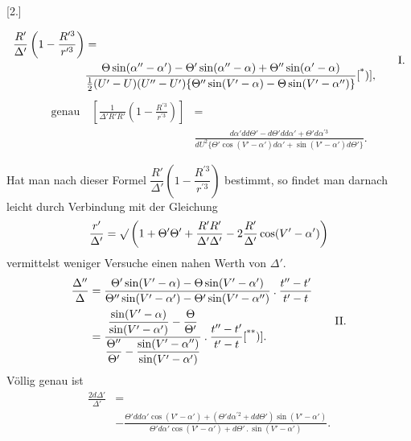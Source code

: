 \clearpage\begingroup{}
\makeatletter\tagsleft@true\let\veqno\@@leqno\makeatother
\noindent{\small [S. 2]}
\begin{center}
[2.]\par\medskip
{}
\end{center}
\begin{equation}
\begin{aligned}
\frac{R'}{\Delta'}\left(1-\frac{R^{\prime3}}{r^{\prime3}}\right)&={}\\
&\frac{\Theta\sin(\alpha''-\alpha')-\Theta'\sin(\alpha''-\alpha)+\Theta''\sin(\alpha'-\alpha)}
{\frac12(U'-U)(U''-U')\{\Theta''\sin(V'-\alpha)-\Theta\sin(V'-\alpha'')\}}
\text{[\textsuperscript{*})]},
\end{aligned}\tag*{I.}
\end{equation}
\begingroup\renewcommand{\thefootnote}{}\endgroup
\begin{equation}
\begin{aligned}
\text{genau}\quad\left[\frac{1}{\Delta'R'R'}\left(1-\frac{R^{\prime3}}{r^{\prime3}}\right)\right]&={}\\
&\frac{d\alpha' dd\Theta'-d\Theta' dd\alpha'+\Theta'd\alpha^{\prime3}}
{dU^2\{\Theta'\cos(V'-\alpha')d\alpha'+\sin(V'-\alpha')d\Theta'\}}.
\end{aligned}\tag*{[a.]}
\end{equation}

Hat man nach dieser Formel $\dfrac{R'}{\Delta'}\left(1-\dfrac{R^{\prime3}}{r^{\prime3}}\right)$ bestimmt, so findet man darnach leicht durch Verbindung mit der Gleichung
\[
\frac{r'}{\Delta'}=\surd\left(1+\Theta'\Theta'+\frac{R'R'}{\Delta'\Delta'}-2\frac{R'}{\Delta'}\cos(V'-\alpha')\right)
\]
\noindent vermittelst weniger Versuche einen nahen Werth von $\Delta'$.
\begin{equation}
\begin{aligned}
\frac{\Delta''}{\Delta}
&=\frac{\Theta'\sin(V'-\alpha)-\Theta\sin(V'-\alpha')}
{\Theta''\sin(V'-\alpha')-\Theta'\sin(V'-\alpha'')}
\mathbin{.}\frac{t''-t'}{t'-t}\\
&=\frac{\dfrac{\sin(V'-\alpha)}{\sin(V'-\alpha')}-\dfrac{\Theta}{\Theta'}}
{\dfrac{\Theta''}{\Theta'}-\dfrac{\sin(V'-\alpha'')}{\sin(V'-\alpha')}}
\mathbin{.}\frac{t''-t'}{t'-t}\text{[\textsuperscript{**})]}.
\end{aligned}\tag*{II.}
\end{equation}
\begingroup\renewcommand{\thefootnote}{}\endgroup
\noindent Völlig genau ist
\begin{equation}
\begin{aligned}
\frac{2d\Delta'}{\Delta'}&={}\\
&-\frac{\Theta'dd\alpha'\cos(V'-\alpha')+(\Theta'd\alpha^{\prime2}+dd\Theta')\sin(V'-\alpha')}
{\Theta'd\alpha'\cos(V'-\alpha')+d\Theta'\mathbin{.}\sin(V'-\alpha')}.
\end{aligned}\tag*{[b.]}
\end{equation}

